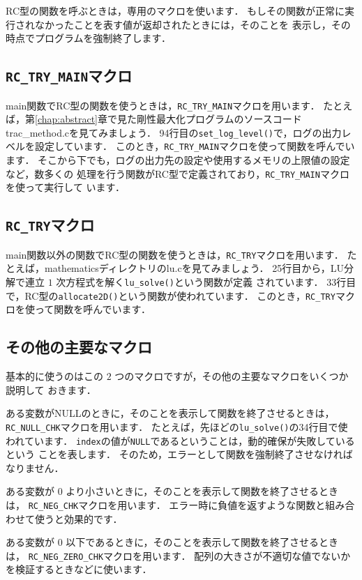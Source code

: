 RC型の関数を呼ぶときは，専用のマクロを使います．
もしその関数が正常に実行されなかったことを表す値が返却されたときには，そのことを
表示し，その時点でプログラムを強制終了します．

\subsection{\texttt{RC\_TRY\_MAIN}マクロ}
main関数でRC型の関数を使うときは，\verb|RC_TRY_MAIN|マクロを用います．
たとえば，第\ref{chap:abstract}章で見た剛性最大化プログラムのソースコード
trac\_method.cを見てみましょう．
94行目の\verb|set_log_level()|で，ログの出力レベルを設定しています．
このとき，\verb|RC_TRY_MAIN|マクロを使って関数を呼んでいます．
そこから下でも，ログの出力先の設定や使用するメモリの上限値の設定など，数多くの
処理を行う関数がRC型で定義されており，\verb|RC_TRY_MAIN|マクロを使って実行して
います．

\subsection{\texttt{RC\_TRY}マクロ}
main関数以外の関数でRC型の関数を使うときは，\verb|RC_TRY|マクロを用います．
たとえば，mathematicsディレクトリのlu.cを見てみましょう．
25行目から，LU分解で連立 $1$ 次方程式を解く\verb|lu_solve()|という関数が定義
されています．
33行目で，RC型の\verb|allocate2D()|という関数が使われています．
このとき，\verb|RC_TRY|マクロを使って関数を呼んでいます．

\subsection{その他の主要なマクロ}
基本的に使うのはこの $2$ つのマクロですが，その他の主要なマクロをいくつか説明して
おきます．

ある変数がNULLのときに，そのことを表示して関数を終了させるときは，
\verb|RC_NULL_CHK|マクロを用います．
たとえば，先ほどの\verb|lu_solve()|の34行目で使われています．
\verb|index|の値が\verb|NULL|であるということは，動的確保が失敗しているという
ことを表します．
そのため，エラーとして関数を強制終了させなければなりません．

ある変数が $0$ より小さいときに，そのことを表示して関数を終了させるときは，
\verb|RC_NEG_CHK|マクロを用います．
エラー時に負値を返すような関数と組み合わせて使うと効果的です．

ある変数が $0$ 以下であるときに，そのことを表示して関数を終了させるときは，
\verb|RC_NEG_ZERO_CHK|マクロを用います．
配列の大きさが不適切な値でないかを検証するときなどに使います．

